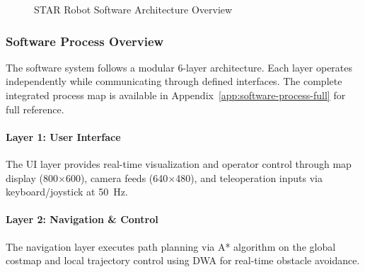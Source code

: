 \begin{figure}[H]
\caption{STAR Robot Software Architecture Overview}
\label{fig:software-arch}
\end{figure}

\subsubsection{Software Process Overview}

The software system follows a modular 6-layer architecture. Each layer operates independently while communicating through defined interfaces. The complete integrated process map is available in Appendix~\ref{app:software-process-full} for full reference.

\paragraph{Layer 1: User Interface}

The UI layer provides real-time visualization and operator control through map display (800$\times$600), camera feeds (640$\times$480), and teleoperation inputs via keyboard/joystick at 50~Hz.



\paragraph{Layer 2: Navigation \& Control}

The navigation layer executes path planning via A* algorithm on the global costmap and local trajectory control using DWA for real-time obstacle avoidance.



